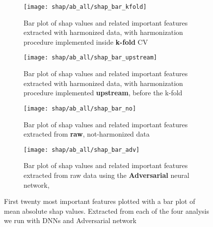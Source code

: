 \documentclass[10pt]{report}
\begin{document}
\begin{figure}[h!]
\centering
\begin{subfigure}[c]{.45\linewidth}
  \texttt{[image: shap/ab\_all/shap\_bar\_kfold]}
   \caption{Bar plot of shap values and related important features extracted with harmonized data, with harmonization procedure implemented inside \textbf{k-fold} CV}
   \label{fig:shap_bar_kfold_}
\end{subfigure}
\begin{subfigure}[c]{.45\textwidth}
   \texttt{[image: shap/ab\_all/shap\_bar\_upstream]}
   \caption{Bar plot of shap values and related important features extracted with harmonized data, with harmonization procedure implemented \textbf{upstream}, before the k-fold}
   \label{}
\end{subfigure}
\hspace{3mm}
\begin{subfigure}[c]{.45\textwidth}
   \texttt{[image: shap/ab\_all/shap\_bar\_no]}
   \caption{Bar plot of shap values and related important features extracted from \textbf{raw}, not-harmonized data}
   \label{}
\end{subfigure}
\begin{subfigure}[c]{.45\textwidth}
   \texttt{[image: shap/ab\_all/shap\_bar\_adv]}
   \caption{Bar plot of shap values and related important features extracted from raw data using the \textbf{Adversarial} neural network,}
   \label{}
\end{subfigure}
\caption{First twenty most important features plotted with a bar plot of mean absolute shap values. Extracted from each of the four analysis we run with DNNs and Adversarial network}
\label{fig:shap_abide_all}
\end{figure}
\end{document}
